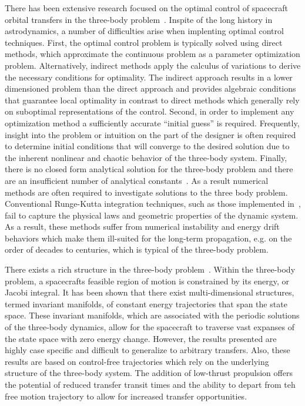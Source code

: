 \documentclass[smallcondensed]{svjour3}
\begin{document}


There has been extensive research focused on the optimal control of spacecraft orbital transfers in the three-body problem~\cite{mingotti2011,grebow2011}. 
Inspite of the long history in astrodynamics, a number of difficulties arise when implenting optimal control techniques.
First, the optimal control problem is typically solved using direct methods, which approximate the continuous problem as a parameter optimization problem.
Alternatively, indirect methods apply the calculus of variations to derive the necessary conditions for optimality.
The indirect approach results in a lower dimensioned problem than the direct approach and provides algebraic conditions that guarantee local optimality in contrast to direct methods which generally rely on suboptimal representations of the control.
Second, in order to implement any optimization method a sufficiently accurate ``initial guess'' is required.
Frequently, insight into the problem or intuition on the part of the designer is often required to determine initial conditions that will converge to the desired solution due to the inherent nonlinear and chaotic behavior of the three-body system.
Finally, there is no closed form analytical solution for the three-body problem and there are an insufficient number of analytical constants~\cite{szebehely1967}.
As a result numerical methods are often required to investigate solutions to the three body problem.
Conventional Runge-Kutta integration techniques, such as those implemented in~\cite{mingotti2011,grebow2011}, fail to capture the physical laws and geometric properties of the dynamic system.
As a result, these methods suffer from numerical instability and energy drift behaviors which make them ill-suited for the long-term propagation, e.g. on the order of decades to centuries, which is typical of the three-body problem. 

There exists a rich structure in the three-body problem~\cite{koon2011,ross2006}.
Within the three-body problem, a spacecrafts feasible region of motion is constrained by its energy, or Jacobi integral.
It has been shown that there exist multi-dimensional structures, termed invariant manifolds, of constant energy trajectories that span the state space. 
These invariant manifolds, which are associated with the periodic solutions of the three-body dynamics, allow for the spacecraft to traverse vast expanses of the state space with zero energy change. 
However, the results presented are highly case specific and difficult to generalize to arbitrary transfers.
Also, these results are based on control-free trajectories which rely on the underlying structure of the three-body system. 
The addition of low-thrust propulsion offers the potential of reduced transfer transit times and the ability to depart from teh free motion trajectory to allow for increased transfer opportunities.
\end{document}
